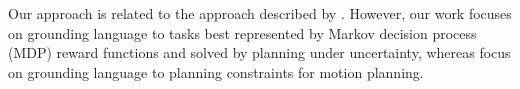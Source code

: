 \documentclass[conference]{IEEEtran}
\begin{document}
Our approach is related to the approach described by \citet{howard14}. 
However, our work focuses
on grounding language to tasks best represented by Markov decision process (MDP)
reward functions
and solved by planning under uncertainty, whereas \citeauthor{howard14} focus on grounding language to
planning constraints for motion planning. 


%
%

\end{document}
